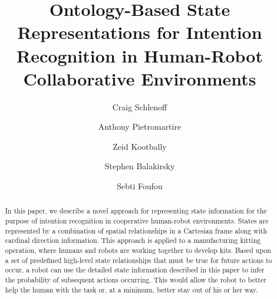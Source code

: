 \documentclass[preprint,12pt]{elsarticle}
\begin{document}
\begin{frontmatter}



\title{Ontology-Based State Representations for Intention Recognition in Human-Robot Collaborative Environments}

 \author[nist,le2i]{Craig Schlenoff}

 \author[nist]{Anthony Pietromartire}

 \author[umd]{Zeid Kootbally}

 \author[nist]{Stephen Balakirsky}

 \author[qatar,le2i]{Sebti Foufou}

 \address[nist]{National Institute of Standards and Technology (NIST), 100 Bureau Drive, Stop 8230, Gaithersburg MD 20899 USA}
 \address[le2i]{University of Burgundy, LE2i Lab, Dijon, France}
 \address[qatar]{Computer Science and Engineering Department Qatar University, Doha Qatar}
 \address[umd]{University of Maryland, Department of Mechanical Engineering, College Park MD 20742 USA}


\begin{abstract}
In this paper, we describe a novel approach for representing state information for the purpose of intention recognition in cooperative human-robot environments. States are represented by a combination of spatial relationships in a Cartesian frame along with cardinal direction information. This approach is applied to a manufacturing kitting operation, where humans and robots are working together to develop kits. Based upon a set of predefined high-level state relationships that must be true for future actions to occur, a robot can use the detailed state information described in this paper to infer the probability of subsequent actions occurring. This would allow the robot to better help the human with the task or, at a minimum, better stay out of his or her way.
\end{abstract}


\end{frontmatter}
\end{document}
